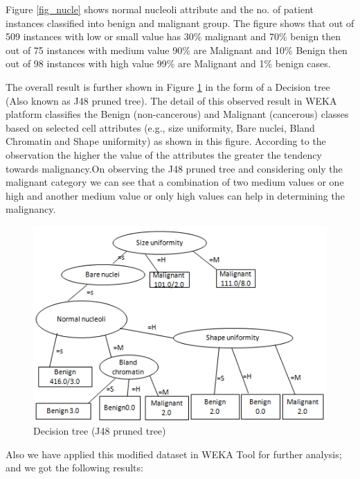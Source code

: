 \documentclass[conference]{IEEEtran}
\begin{document}
Figure \ref{fig_nucle}  shows normal nucleoli attribute and the no. of patient instances classified into benign and malignant group. The figure shows that out of 509 instances with low or small value has 30\% malignant and 70\% benign then out of 75 instances with medium value 90\% are Malignant and 10\% Benign then out of 98 instances with high value 99\% are Malignant and 1\% benign cases.

The overall result is further shown in Figure \ref{fig_tree} in the form of a Decision tree (Also known as J48 pruned tree). The detail of this observed result in WEKA platform classifies the Benign (non-cancerous) and Malignant (cancerous) classes based on selected cell attributes (e.g., size uniformity, Bare nuclei, Bland Chromatin and Shape uniformity) as shown in this figure. According to the observation  the higher the value of the attributes the greater the tendency towards malignancy.On observing the J48 pruned tree and considering only the malignant category we can see that a combination of two medium values or one high and another medium value or only high values can help in determining the malignancy.
 

%



\begin{figure}[!h]
\centering
\includegraphics[scale=0.5]{tree}
\caption{Decision tree (J48 pruned tree)}
\label{fig_tree}
\end{figure}


Also we have applied this modified dataset in WEKA Tool for further analysis; and we got the following results:
\end{document}
